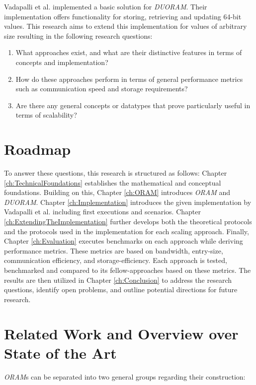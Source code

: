 Vadapalli et al. implemented a basic solution for \textit{DUORAM}.
Their implementation offers functionality for storing, retrieving and updating 64-bit values.
This research aims to extend this implementation for values of arbitrary size resulting in the following research questions:
\begin{enumerate}
    \item What approaches exist, and what are their distinctive features in terms of concepts and implementation?
    \item How do these approaches perform in terms of general performance metrics such as communication speed and storage requirements?
    \item Are there any general concepts or datatypes that prove particularly useful in terms of scalability?
\end{enumerate}

\section{Roadmap}\label{sec:roadmap}
To answer these questions, this research is structured as follows:
Chapter \ref{ch:TechnicalFoundations} establishes the mathematical and conceptual foundations.
Building on this, Chapter \ref{ch:ORAM} introduces \textit{ORAM} and \textit{DUORAM}.
Chapter \ref{ch:Implementation} introduces the given implementation by Vadapalli et al. \cite{vadapalli2023duoram} including first executions and scenarios.
Chapter \ref{ch:ExtendingTheImplementation} further develops both the theoretical protocols and the protocols used in the implementation for each scaling approach.
Finally, Chapter \ref{ch:Evaluation} executes benchmarks on each approach while deriving performance metrics.
These metrics are based on bandwidth, entry-size, communication efficiency, and storage-efficiency.
Each approach is tested, benchmarked and compared to its fellow-approaches based on these metrics.
The results are then utilized in Chapter \ref{ch:Conclusion} to address the research questions, identify open problems, and outline potential directions for future research.

\section{Related Work and Overview over State of the Art}\label{sec:relatedWorks}
\textit{ORAM}s can be separated into two general groups regarding their construction:
